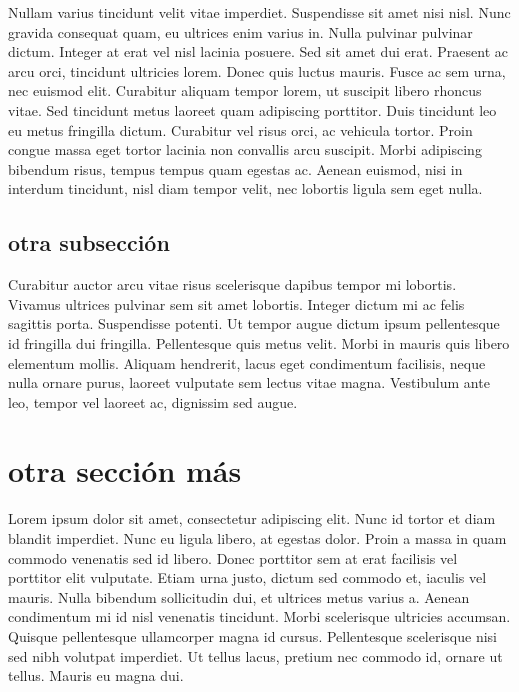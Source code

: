 \documentclass[a4paper,10pt]{article}
\begin{document}
\begin{multicols}{3}
Nullam varius tincidunt velit vitae imperdiet. Suspendisse sit amet nisi nisl. Nunc gravida consequat quam, eu ultrices enim varius in. 
Nulla 
pulvinar pulvinar dictum. Integer at erat vel nisl lacinia posuere. Sed sit amet dui erat. Praesent ac arcu orci, tincidunt ultricies 
lorem. 
Donec quis luctus mauris. Fusce ac sem urna, nec euismod elit. Curabitur aliquam tempor lorem, ut suscipit libero rhoncus vitae. Sed 
tincidunt metus laoreet quam adipiscing porttitor. Duis tincidunt leo eu metus fringilla dictum. Curabitur vel risus orci, ac vehicula 
tortor. Proin congue massa eget tortor lacinia non convallis arcu suscipit. Morbi adipiscing bibendum risus, tempus tempus quam egestas 
ac. 
Aenean euismod, nisi in interdum tincidunt, nisl diam tempor velit, nec lobortis ligula sem eget nulla.

\subsection{otra subsección}
Curabitur auctor arcu vitae risus scelerisque dapibus tempor mi lobortis. Vivamus ultrices pulvinar sem sit amet lobortis. Integer dictum 
mi 
ac felis sagittis porta. Suspendisse potenti. Ut tempor augue dictum ipsum pellentesque id fringilla dui fringilla. Pellentesque quis 
metus 
velit. Morbi in mauris quis libero elementum mollis. Aliquam hendrerit, lacus eget condimentum facilisis, neque nulla ornare purus, 
laoreet 
vulputate sem lectus vitae magna. Vestibulum ante leo, tempor vel laoreet ac, dignissim sed augue.


\section{otra sección más}
Lorem ipsum dolor sit amet, consectetur adipiscing elit. Nunc id tortor et diam blandit imperdiet. Nunc eu ligula libero, at egestas 
dolor. 
Proin a massa in quam commodo venenatis sed id libero. Donec porttitor sem at erat facilisis vel porttitor elit vulputate. Etiam urna 
justo, 
dictum sed commodo et, iaculis vel mauris. Nulla bibendum sollicitudin dui, et ultrices metus varius a. Aenean condimentum mi id nisl 
venenatis tincidunt. Morbi scelerisque ultricies accumsan. Quisque pellentesque ullamcorper magna id cursus. Pellentesque scelerisque nisi 
sed nibh volutpat imperdiet. Ut tellus lacus, pretium nec commodo id, ornare ut tellus. Mauris eu magna dui.


\end{multicols}
\end{document}
